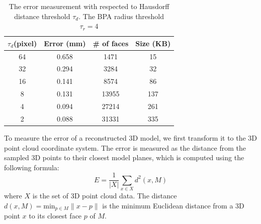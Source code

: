 \documentclass{llncs}
\begin{document}
\setlength{\tabcolsep}{4pt}
\begin{table}[btp]
\begin{center}
\caption{The error measurement with respected to Hausdorff distance threshold $\tau_d$.
The BPA radius threshold $\tau_r = 4$}
\label{tbl_em}
  \begin{tabular}[t]{||c||c|c|c||}
    \hline
    $\tau_{d} $(pixel) & Error (mm)& \# of faces & Size (KB) \\
    \hline \hline
    64 & 0.658 & 1471 & 15\\   %
    \hline		      %
    32 & 0.294 & 3284 & 32\\   %
    \hline		      %
    16 & 0.141 & 8574 & 86\\   %
    \hline		      %
    8 & 0.131 & 13955 & 137\\  %
    \hline		      %
    4 & 0.094 & 27214 & 261\\  %
    \hline		      %
    2 & 0.088 & 31331 & 335\\  %
    \hline
  \end{tabular}
\end{center}
\end{table}
\setlength{\tabcolsep}{1.4pt}
To measure the error of a reconstructed 3D model,
we first transform it to the 3D point cloud coordinate system.
The error is measured as the distance from the sampled 3D points to their closest model planes, which
is computed using the following formula:
\begin{equation}\label{eq_em}
E = \frac{1}{|X|}\sum_{x\in{X}}{d^2(x, M)}
\end{equation}
where $X$ is the set of 3D point cloud data. The distance
$d(x, M) = \text{min}_{p \in M}\lVert x - p \lVert$ is the minimum Euclidean distance from
a 3D point $x$ to its closest face $p$ of $M$.
\end{document}
